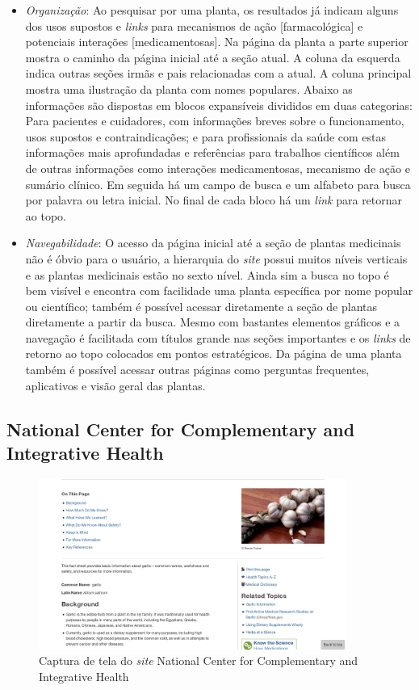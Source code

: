\begin{itemize}
\item
  \emph{Organização}: Ao pesquisar por uma planta, os resultados já indicam alguns dos usos supostos e \emph{links} para mecanismos de ação {[}farmacológica{]} e potenciais interações {[}medicamentosas{]}. Na página da planta a parte superior mostra o caminho da página inicial até a seção atual. A coluna da esquerda indica outras seções irmãs e pais relacionadas com a atual. A coluna principal mostra uma ilustração da planta com nomes populares. Abaixo as informações são dispostas em blocos expansíveis divididos em duas categorias: Para pacientes e cuidadores, com informações breves sobre o funcionamento, usos supostos e contraindicações; e para profissionais da saúde com estas informações mais aprofundadas e referências para trabalhos científicos além de outras informações como interações medicamentosas, mecanismo de ação e sumário clínico. Em seguida há um campo de busca e um alfabeto para busca por palavra ou letra inicial. No final de cada bloco há um \emph{link} para retornar ao topo.
\item
  \emph{Navegabilidade}: O acesso da página inicial até a seção de plantas medicinais não é óbvio para o usuário, a hierarquia do \emph{site} possui muitos níveis verticais e as plantas medicinais estão no sexto nível. Ainda sim a busca no topo é bem visível e encontra com facilidade uma planta específica por nome popular ou científico; também é possível acessar diretamente a seção de plantas diretamente a partir da busca. Mesmo com bastantes elementos gráficos e a navegação é facilitada com títulos grande nas seções importantes e os \emph{links} de retorno ao topo colocados em pontos estratégicos. Da página de uma planta também é possível acessar outras páginas como perguntas frequentes, aplicativos e visão geral das plantas.
\end{itemize}

\subsection{National Center for Complementary and Integrative Health}\label{national-center-for-complementary-and-integrative-health}

\begin{figure}
\centering
\caption{\label{fig-ncihh}Captura de tela do \emph{site} National Center for Complementary and Integrative Health}
\includegraphics[width=0.9\textwidth]{images/similares/nccih.png}
\end{figure}

